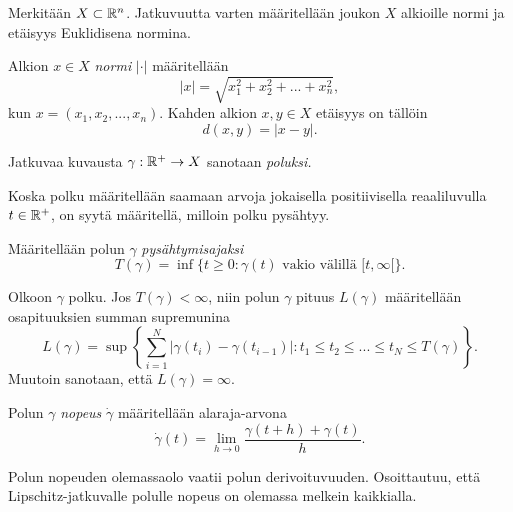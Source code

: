 \documentclass[12pt,oneside,a4paper]{amsbook} %
\begin{document}
Merkitään $X \subset \mathbb{R}^n$. Jatkuvuutta varten määritellään joukon $X$ alkioille normi ja etäisyys Euklidisena normina.
\begin{definition}
    Alkion $x \in X$ \textit{normi} $|\cdot|$ määritellään
    \begin{equation*}
        |x| = \sqrt{x_1^2 + x_2^2 + ... + x_n^2},
    \end{equation*}
    kun $x = (x_1, x_2, ... , x_n)$. Kahden alkion $x, y \in X$ etäisyys on tällöin
    \begin{equation*}
        d(x, y) = |x - y|.
    \end{equation*}
\end{definition}

\begin{definition}
    Jatkuvaa kuvausta $\gamma:{\mathbb{R}^{+}} \to X$ sanotaan \textit{poluksi.}
\end{definition}

Koska polku määritellään saamaan arvoja jokaisella positiivisella reaaliluvulla $t \in {\mathbb{R}^{+}}$, on syytä määritellä, milloin polku pysähtyy.

\begin{definition}
    Määritellään polun $\gamma$ \textit{pysähtymisajaksi} 
    \begin{equation*}
        T(\gamma) = \inf\{t\ge0:\gamma(t) \text{ vakio välillä } [t,\infty[ \}.
    \end{equation*}
\end{definition}

\begin{definition}
    Olkoon $\gamma$ polku. Jos $T(\gamma) < \infty$, niin polun $\gamma$ pituus $L(\gamma)$ määritellään osapituuksien summan supremunina
    \begin{equation*}
        L(\gamma) = \sup\left\{\sum_{i=1}^N|\gamma(t_i) - \gamma(t_{i-1})| : t_1 \le t_2 \le ... \le t_N \le T(\gamma)\right\}.
    \end{equation*}
    Muutoin sanotaan, että $L(\gamma) = \infty$.
\end{definition}

\begin{definition}
    Polun $\gamma$ \textit{nopeus} $\dot \gamma$ määritellään alaraja-arvona
    \begin{equation*}
        \dot\gamma(t) = \lim_{h\to 0} \frac{\gamma(t+h) + \gamma(t)}{h}.
    \end{equation*}
\end{definition}

Polun nopeuden olemassaolo vaatii polun derivoituvuuden. Osoittautuu, että Lipschitz-jatkuvalle polulle nopeus on olemassa melkein kaikkialla.
\end{document}
